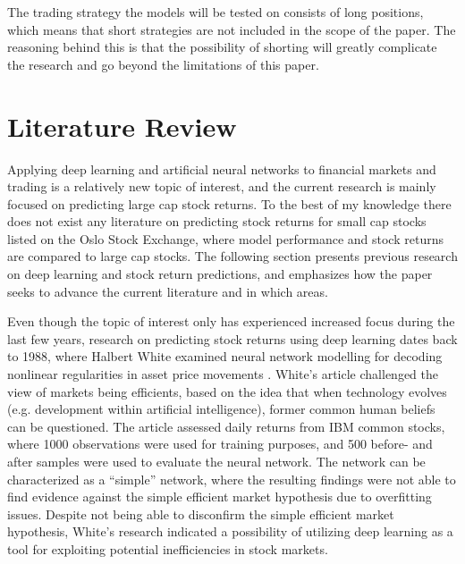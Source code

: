 \indent \newline
The trading strategy the models will be tested on consists of long positions, which means that short strategies are not included in the scope of the paper. The reasoning behind this is that the possibility of shorting will greatly complicate the research and go beyond the limitations of this paper. 

\section{Literature Review}
Applying deep learning and artificial neural networks to financial markets and trading is a relatively new topic of interest, and the current research is mainly focused on predicting large cap stock returns. To the best of my knowledge there does not exist any literature on predicting stock returns for small cap stocks listed on the Oslo Stock Exchange, where model performance and stock returns are compared to large cap stocks. The following section presents previous research on deep learning and stock return predictions, and emphasizes how the paper seeks to advance the current literature and in which areas.     

\indent\newline
Even though the topic of interest only has experienced increased focus during the last few years, research on predicting stock returns using deep learning dates back to 1988, where Halbert White examined neural network modelling for decoding nonlinear regularities in asset price movements \cite{white}. White’s article challenged the view of markets being efficients, based on the idea that when technology evolves (e.g. development within artificial intelligence), former common human beliefs can be questioned. The article assessed daily returns from IBM common stocks, where 1000 observations were used for training purposes, and 500 before- and after samples were used to evaluate the neural network. The network can be characterized as a “simple” network, where the resulting findings were not able to find evidence against the simple efficient market hypothesis due to overfitting issues. Despite not being able to disconfirm the simple efficient market hypothesis, White’s research indicated a possibility of utilizing deep learning as a tool for exploiting potential inefficiencies in stock markets.  

